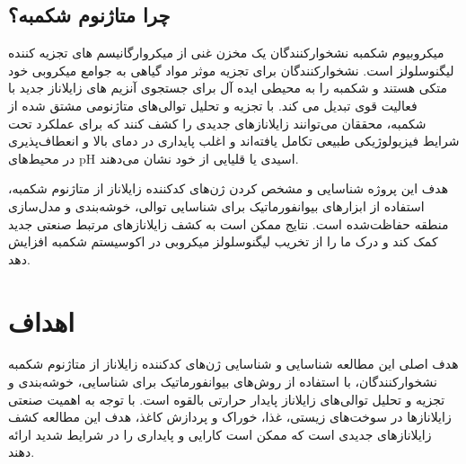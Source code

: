         \subsection{چرا متاژنوم شکمبه؟}
            میکروبیوم شکمبه نشخوارکنندگان یک مخزن غنی از میکروارگانیسم های تجزیه کننده لیگنوسلولز است. نشخوارکنندگان برای تجزیه موثر مواد گیاهی به جوامع میکروبی خود متکی هستند و شکمبه را به محیطی ایده آل برای جستجوی آنزیم های زایلاناز جدید با فعالیت قوی تبدیل می کند. با تجزیه و تحلیل توالی‌های متاژنومی مشتق شده از شکمبه، محققان می‌توانند زایلانازهای جدیدی را کشف کنند که برای عملکرد تحت شرایط فیزیولوژیکی طبیعی تکامل یافته‌اند و اغلب پایداری در دمای بالا و انعطاف‌پذیری در محیط‌های 
            pH 
            اسیدی یا قلیایی از خود نشان می‌دهند.

            هدف این پروژه شناسایی و مشخص کردن ژن‌های کدکننده زایلاناز از متاژنوم شکمبه، استفاده از ابزارهای بیوانفورماتیک برای شناسایی توالی، خوشه‌بندی و مدل‌سازی منطقه حفاظت‌شده است. نتایج ممکن است به کشف زایلانازهای مرتبط صنعتی جدید کمک کند و درک ما را از تخریب لیگنوسلولز میکروبی در اکوسیستم شکمبه افزایش دهد.

    \section{اهداف}
        هدف اصلی این مطالعه شناسایی و شناسایی ژن‌های کدکننده زایلاناز از متاژنوم شکمبه نشخوارکنندگان، با استفاده از روش‌های بیوانفورماتیک برای شناسایی، خوشه‌بندی و تجزیه و تحلیل توالی‌های زایلاناز پایدار حرارتی بالقوه است. با توجه به اهمیت صنعتی زایلانازها در سوخت‌های زیستی، غذا، خوراک و پردازش کاغذ، هدف این مطالعه کشف زایلانازهای جدیدی است که ممکن است کارایی و پایداری را در شرایط شدید ارائه دهند.

